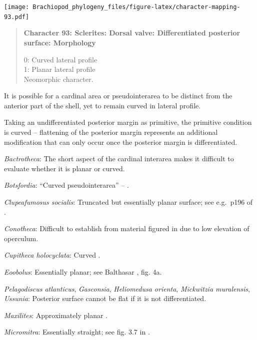 \documentclass[openany]{book}
\begin{document}
\texttt{[image: Brachiopod\_phylogeny\_files/figure-latex/character-mapping-93.pdf]}

\begin{quote}
\textbf{Character 93: Sclerites: Dorsal valve: Differentiated posterior
surface: Morphology}

0: Curved lateral profile\\
1: Planar lateral profile\\
Neomorphic character.
\end{quote}

It is possible for a cardinal area or pseudointerarea to be distinct
from the anterior part of the shell, yet to remain curved in lateral
profile.

Taking an undifferentiated posterior margin as primitive, the primitive
condition is curved -- flattening of the posterior margin represents an
additional modification that can only occur once the posterior margin is
differentiated.

\hypertarget{Bactrotheca-coding-93}{}
\emph{Bactrotheca}: The short aspect of the cardinal interarea
\citep{Valent2012} makes it difficult to evaluate whether it is planar
or curved.

\hypertarget{Botsfordia-coding-93}{}
\emph{Botsfordia}: ``Curved pseudointerarea'' --
\citet{Skovsted2017Depthrelated}.

\hypertarget{Clupeafumosus_socialis-coding-93}{}
\emph{Clupeafumosus socialis}: Truncated but essentially planar surface;
see e.g.~p196 of \citet{Topper2013Reappraisalof}.

\hypertarget{Conotheca-coding-93}{}
\emph{Conotheca}: Difficult to establish from material figured in
\citet{Devaere2014} due to low elevation of operculum.

\hypertarget{Cupitheca_holocyclata-coding-93}{}
\emph{Cupitheca holocyclata}: Curved \citep{Sun2018}.

\hypertarget{Eoobolus-coding-93}{}
\emph{Eoobolus}: Essentially planar; see Balthasar
\citeyearpar{Balthasar2009Thebrachiopod}, fig. 4a.

\hypertarget{Gasconsia-coding-93}{}
\emph{Pelagodiscus atlanticus}, \emph{Gasconsia}, \emph{Heliomedusa
orienta}, \emph{Mickwitzia muralensis}, \emph{Ussunia}: Posterior
surface cannot be flat if it is not differentiated.

\hypertarget{Maxilites-coding-93}{}
\emph{Maxilites}: Approximately planar \citep{Marek1972}.

\hypertarget{Micromitra-coding-93}{}
\emph{Micromitra}: Essentially straight; see fig. 3.7 in
\citet{Ushatinskaya2016Protegulumand}.
\end{document}
